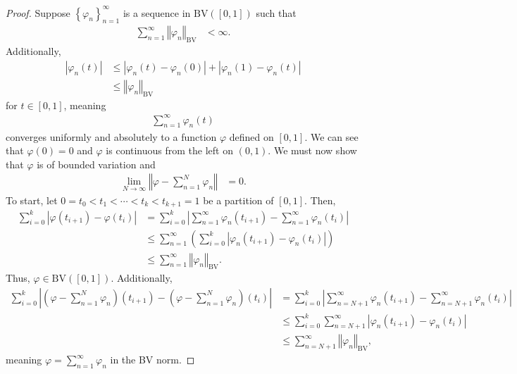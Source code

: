 \documentclass[12pt]{extarticle}
\newcommand{\norm}[1]{\left\Vert #1\right\Vert}
\newcommand{\set}[1]{\left\{#1\right\}}
\theoremstyle{plain}
\theoremstyle{definition}
\theoremstyle{note}
\begin{document}
\begin{proof}
  Suppose $\set{\varphi_n}_{n=1}^{\infty}$ is a sequence in $\text{BV}\left([0,1]\right)$ such that
  \begin{align*}
    \sum_{n=1}^{\infty}\norm{\varphi_n}_{\text{BV}} & < \infty.
  \end{align*}
  Additionally,
  \begin{align*}
    \left\vert \varphi_n(t) \right\vert &\leq \left\vert \varphi_n(t) - \varphi_n(0) \right\vert + \left\vert \varphi_n(1) - \varphi_n(t) \right\vert\\
                                        &\leq \norm{\varphi_n}_{\text{BV}}
  \end{align*}
  for $t\in [0,1]$, meaning
  \begin{align*}
    \sum_{n=1}^{\infty}\varphi_n(t)
  \end{align*}
  converges uniformly and absolutely to a function $\varphi$ defined on $[0,1]$. We can see that $\varphi(0) = 0$ and $\varphi$ is continuous from the left on $(0,1)$. We must now show that $\varphi$ is of bounded variation and
  \begin{align*}
    \lim_{N\rightarrow\infty}\norm{\varphi - \sum_{n=1}^{N}\varphi_n} &= 0.
  \end{align*}
  To start, let $0 = t_0 < t_1 < \cdots < t_k < t_{k+1} = 1$ be a partition of $[0,1]$. Then,
  \begin{align*}
    \sum_{i=0}^{k}\left\vert \varphi\left(t_{i+1}\right)- \varphi\left(t_i\right) \right\vert &= \sum_{i=0}^{k}\left\vert \sum_{n=1}^{\infty}\varphi_{n}(t_{i+1}) - \sum_{n=1}^{\infty}\varphi_n(t_i) \right\vert\\
                                                                                              &\leq \sum_{n=1}^{\infty}\left(\sum_{i=0}^{k}\left\vert \varphi_n(t_{i+1}) - \varphi_n(t_i) \right\vert\right)\\
                                                                                              &\leq \sum_{n=1}^{\infty}\norm{\varphi_n}_{\text{BV}}.
  \end{align*}
  Thus, $\varphi \in \text{BV}\left([0,1]\right)$. Additionally,
  \begin{align*}
    \sum_{i=0}^{k}\left\vert \left(\varphi - \sum_{n=1}^{N}\varphi_n\right)\left(t_{i+1}\right) - \left(\varphi - \sum_{n=1}^{N}\varphi_n\right)\left(t_i\right) \right\vert &= \sum_{i=0}^{k}\left\vert \sum_{n=N+1}^{\infty}\varphi_n\left(t_{i+1}\right) - \sum_{n=N+1}^{\infty}\varphi_n\left(t_{i}\right) \right\vert \\
                                                                                                                                                                                                 &\leq \sum_{i=0}^{k}\sum_{n=N+1}^{\infty}\left\vert \varphi_{n}\left(t_{i+1}\right)-\varphi_n\left(t_i\right) \right\vert\\
                                                                                                &\leq \sum_{n=N+1}^{\infty}\norm{\varphi_n}_{\text{BV}},
  \end{align*}
  meaning $\displaystyle\varphi = \sum_{n=1}^{\infty}\varphi_n$ in the BV norm.
\end{proof}
\end{document}
